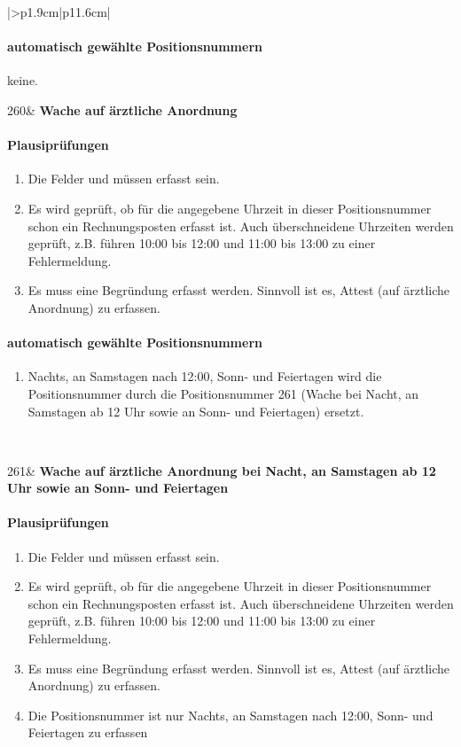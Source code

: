\begin{mpsupertabular}{|>{\centering}p{1.9cm}|p{11.6cm}|}
\paragraph{automatisch gewählte Positionsnummern}
keine.
\\ \hline


260&
\textbf{Wache auf ärztliche Anordnung}
\paragraph{Plausiprüfungen}
\begin{enumerate}
\item
Die Felder  und  müssen erfasst sein.
\item
Es wird geprüft, ob für die angegebene 
Uhrzeit in dieser Positionsnummer
schon ein Rechnungsposten erfasst ist. Auch überschneidene Uhrzeiten
werden geprüft, z.B. führen 10:00 bis 12:00 und 11:00 bis 13:00 zu einer
Fehlermeldung.
\item
Es muss eine Begründung erfasst werden. Sinnvoll ist es, Attest (auf
ärztliche Anordnung) zu erfassen.
\end{enumerate}
\paragraph{automatisch gewählte Positionsnummern}
\begin{enumerate}
\item
Nachts, an Samstagen nach 12:00, Sonn- und Feiertagen wird die
Positionsnummer durch die Positionsnummer 261 (Wache bei Nacht, an
Samstagen ab 12 Uhr sowie an Sonn- und Feiertagen) ersetzt.
\end{enumerate}
\\ \hline


261&
\textbf{Wache auf ärztliche Anordnung bei Nacht, an
Samstagen ab 12 Uhr sowie an Sonn- und Feiertagen}
\paragraph{Plausiprüfungen}
\begin{enumerate}
\item
Die Felder  und  müssen erfasst sein.
\item
Es wird geprüft, ob für die angegebene 
Uhrzeit in dieser Positionsnummer
schon ein Rechnungsposten erfasst ist. Auch überschneidene Uhrzeiten
werden geprüft, z.B. führen 10:00 bis 12:00 und 11:00 bis 13:00 zu einer
Fehlermeldung.
\item
Es muss eine Begründung erfasst werden. Sinnvoll ist es, Attest (auf
ärztliche Anordnung) zu erfassen.
\item
Die Positionsnummer ist nur Nachts, an Samstagen nach 12:00, 
Sonn- und Feiertagen zu erfassen
\end{enumerate}

\end{mpsupertabular}
